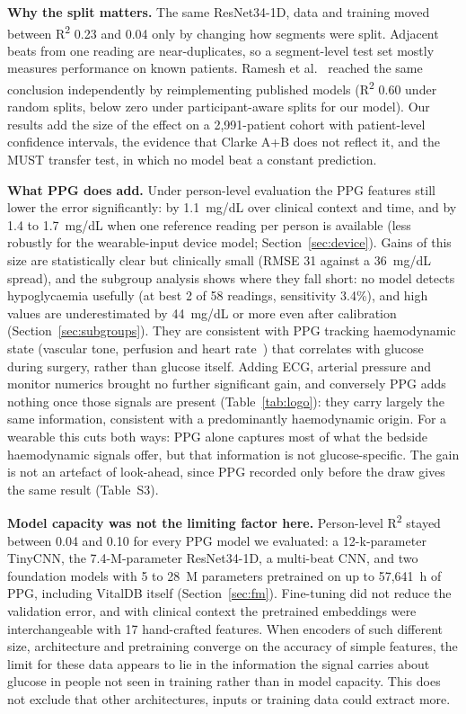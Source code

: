 \documentclass[11pt]{article}
\newcommand{\RR}{R\textsuperscript{2}}
\newcommand{\mgdl}{mg/dL}
\begin{document}
\textbf{Why the split matters.} The same ResNet34-1D, data and training moved between \RR{} 0.23 and 0.04 only by changing how segments were split. Adjacent beats from one reading are near-duplicates, so a segment-level test set mostly measures performance on known patients. Ramesh et al.~\citep{ramesh2026} reached the same conclusion independently by reimplementing published models (\RR{} 0.60 under random splits, below zero under participant-aware splits for our model). Our results add the size of the effect on a 2,991-patient cohort with patient-level confidence intervals, the evidence that Clarke A+B does not reflect it, and the MUST transfer test, in which no model beat a constant prediction.

\textbf{What PPG does add.} Under person-level evaluation the PPG features still lower the error significantly: by 1.1~\mgdl{} over clinical context and time, and by 1.4 to 1.7~\mgdl{} when one reference reading per person is available (less robustly for the wearable-input device model; Section~\ref{sec:device}). Gains of this size are statistically clear but clinically small (RMSE 31 against a 36~\mgdl{} spread), and the subgroup analysis shows where they fall short: no model detects hypoglycaemia usefully (at best 2 of 58 readings, sensitivity 3.4\%), and high values are underestimated by 44~\mgdl{} or more even after calibration (Section~\ref{sec:subgroups}). They are consistent with PPG tracking haemodynamic state (vascular tone, perfusion and heart rate~\citep{allen2007}) that correlates with glucose during surgery, rather than glucose itself. Adding ECG, arterial pressure and monitor numerics brought no further significant gain, and conversely PPG adds nothing once those signals are present (Table~\ref{tab:logo}): they carry largely the same information, consistent with a predominantly haemodynamic origin. For a wearable this cuts both ways: PPG alone captures most of what the bedside haemodynamic signals offer, but that information is not glucose-specific. The gain is not an artefact of look-ahead, since PPG recorded only before the draw gives the same result (Table~S3).

\textbf{Model capacity was not the limiting factor here.} Person-level \RR{} stayed between 0.04 and 0.10 for every PPG model we evaluated: a 12-k-parameter TinyCNN, the 7.4-M-parameter ResNet34-1D, a multi-beat CNN, and two foundation models with 5 to 28~M parameters pretrained on up to 57,641~h of PPG, including VitalDB itself (Section~\ref{sec:fm}). Fine-tuning did not reduce the validation error, and with clinical context the pretrained embeddings were interchangeable with 17 hand-crafted features. When encoders of such different size, architecture and pretraining converge on the accuracy of simple features, the limit for these data appears to lie in the information the signal carries about glucose in people not seen in training rather than in model capacity. This does not exclude that other architectures, inputs or training data could extract more.
\end{document}
